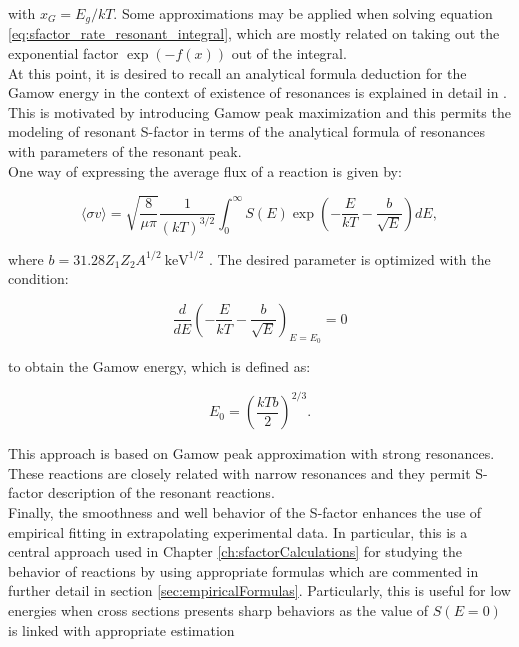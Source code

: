 \documentclass[openany]{book}
\begin{document}
with $x_G = E_g/kT$. Some approximations may be applied when solving equation \ref{eq:sfactor_rate_resonant_integral}, which are mostly related on taking out the exponential factor  $\exp{(-f(x))}$ out of the integral. \\

At this point, it is desired to recall an analytical formula deduction for the Gamow energy in the context of existence of resonances is explained in detail in  \cite{kimura_bonasera_2013}. This is motivated by introducing Gamow peak maximization and this permits the modeling of resonant S-factor in terms of the analytical formula of resonances with parameters of the resonant peak. \\

One way of expressing the average flux of a reaction is given by: 

\begin{equation}\label{eq:potential_sfactor_flux}
	\langle \sigma v \rangle = \sqrt{\frac{8}{\mu \pi}} \frac{1}{(kT)^{3/2}} \int_0^{\infty} S(E) \exp {\left( - \frac{E}{kT} - \frac{b}{\sqrt E} \right) dE },
\end{equation}

where $b = 31.28Z_1Z_2A^{1/2} \ \mathrm{keV^{1/2}}$ . The desired parameter is optimized with the condition:

\begin{equation}\label{eq:potential_sfactor_condition}
	\frac{d}{dE} \left(- \frac{E}{kT} - \frac{b}{\sqrt{E}}\right)_{E = E_0} = 0
\end{equation}

to obtain the Gamow energy, which is defined as: 

\begin{equation}\label{eq:potential_sfactor_gamowEnergy}
	E_0 = \left(\frac{kTb}{2}\right)^{2/3}.
\end{equation}

This approach is based on Gamow peak approximation with strong resonances. These reactions are closely related with narrow resonances and they permit S-factor description of the resonant reactions.   \\

Finally, the smoothness and well behavior of the S-factor enhances the use of empirical fitting in extrapolating experimental data. In particular, this is a central approach used in Chapter \ref{ch:sfactorCalculations} for studying the behavior of reactions by using appropriate formulas which are commented in further detail in section \ref{sec:empiricalFormulas}. Particularly, this is useful for low energies when cross sections presents sharp behaviors as the value of $S(E = 0)$ is linked with appropriate estimation  \\
\end{document}
